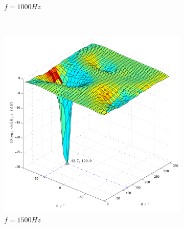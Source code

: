\begin{figure}
\begin{subfigure}[b]{0.48\textwidth}
                \caption{$f=1000Hz$}
                \label{fig:Sim_sine_f_1000_Phi_45_Theta_120_dB_SNR_100dB}
        \end{subfigure}
        ~ %
        \begin{subfigure}[b]{0.48\textwidth}
                \centering
                \includegraphics[width=\textwidth]{grafiken/02_Konzeptionierung/Sim_sine_f_1500_Phi_45_Theta_120_dB_SNR_100dB}
                \caption{$f=1500Hz$}
                \label{fig:Sim_sine_f_1500_Phi_45_Theta_120_dB_SNR_100dB}
        \end{subfigure}
                ~ %
        \begin{subfigure}[b]{0.48\textwidth}
                \centering

\end{subfigure}
\end{figure}
